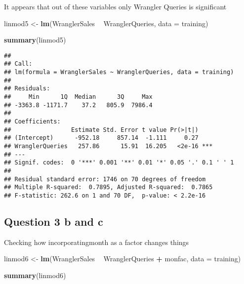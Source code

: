 \documentclass[]{article}
\newenvironment{Shaded}{\begin{snugshade}}{\end{snugshade}}
\newcommand{\KeywordTok}[1]{\textcolor[rgb]{0.13,0.29,0.53}{\textbf{#1}}}
\newcommand{\DataTypeTok}[1]{\textcolor[rgb]{0.13,0.29,0.53}{#1}}
\newcommand{\StringTok}[1]{\textcolor[rgb]{0.31,0.60,0.02}{#1}}
\newcommand{\OperatorTok}[1]{\textcolor[rgb]{0.81,0.36,0.00}{\textbf{#1}}}
\newcommand{\NormalTok}[1]{#1}
\begin{document}
It appears that out of these variables only Wrangler Queries is
significant

\begin{Shaded}
\begin{Highlighting}[]
\NormalTok{linmod5 <-}\StringTok{ }\KeywordTok{lm}\NormalTok{(WranglerSales }\OperatorTok{~}\StringTok{ }\NormalTok{WranglerQueries, }\DataTypeTok{data =}\NormalTok{ training)}

\KeywordTok{summary}\NormalTok{(linmod5)}
\end{Highlighting}
\end{Shaded}

\begin{verbatim}
## 
## Call:
## lm(formula = WranglerSales ~ WranglerQueries, data = training)
## 
## Residuals:
##     Min      1Q  Median      3Q     Max 
## -3363.8 -1171.7    37.2   805.9  7986.4 
## 
## Coefficients:
##                 Estimate Std. Error t value Pr(>|t|)    
## (Intercept)      -952.18     857.14  -1.111     0.27    
## WranglerQueries   257.86      15.91  16.205   <2e-16 ***
## ---
## Signif. codes:  0 '***' 0.001 '**' 0.01 '*' 0.05 '.' 0.1 ' ' 1
## 
## Residual standard error: 1746 on 70 degrees of freedom
## Multiple R-squared:  0.7895, Adjusted R-squared:  0.7865 
## F-statistic: 262.6 on 1 and 70 DF,  p-value: < 2.2e-16
\end{verbatim}

\subsection{Question 3 b and c}\label{question-3-b-and-c}

Checking how incorporatingmonth as a factor changes things

\begin{Shaded}
\begin{Highlighting}[]
\NormalTok{linmod6 <-}\StringTok{ }\KeywordTok{lm}\NormalTok{(WranglerSales }\OperatorTok{~}\StringTok{ }\NormalTok{WranglerQueries }\OperatorTok{+}\StringTok{ }\NormalTok{monfac, }\DataTypeTok{data =}\NormalTok{ training)}

\KeywordTok{summary}\NormalTok{(linmod6)}
\end{Highlighting}
\end{Shaded}
\end{document}
